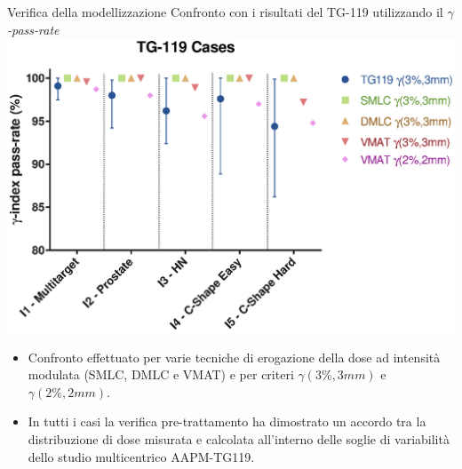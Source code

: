 \documentclass{beamer}
\begin{document}
\begin{frame}[t]{Verifica della modellizzazione}
\footnotesize
\centering
\alert{Confronto con i risultati del TG-119 utilizzando il $\gamma$\textit{-pass-rate}}\\\vspace{.1cm}
\includegraphics[width=.8\textwidth]{../cap2/TG119_Plots/TG_119_gamma.eps}
\begin{itemize}
\scriptsize
\item Confronto effettuato per varie tecniche di erogazione della dose ad intensità modulata (SMLC, DMLC e VMAT) e per criteri $\gamma(3\%,3mm)$ e $\gamma(2\%,2mm)$.
\item In tutti i casi la verifica pre-trattamento ha dimostrato un accordo tra la distribuzione di dose misurata e calcolata all'interno delle soglie di variabilità dello studio multicentrico AAPM-TG119.
\end{itemize}
\end{frame}
\end{document}
